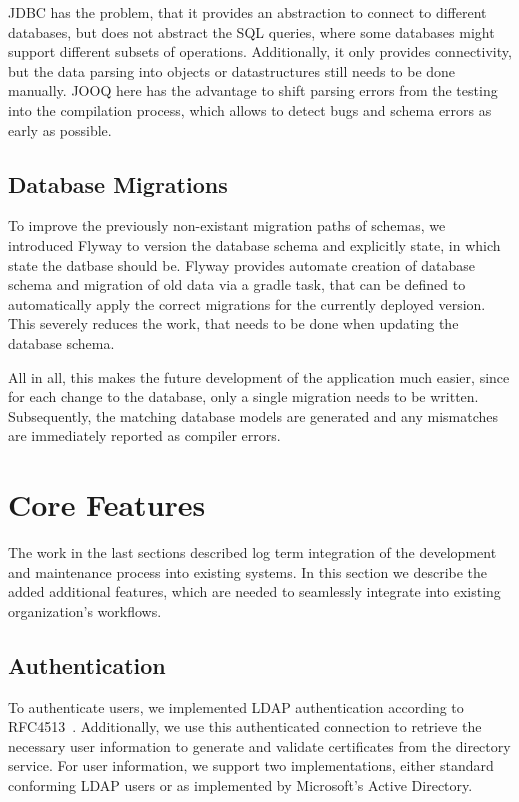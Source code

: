 JDBC has the problem, that it provides an abstraction to connect to different databases, but does not abstract the
SQL queries, where some databases might support different subsets of operations.
Additionally, it only provides connectivity, but the data parsing into objects or datastructures still needs to be done
manually.
JOOQ here has the advantage to shift parsing errors from the testing into the compilation process, which allows to
detect bugs and schema errors as early as possible.

\subsection*{Database Migrations}
To improve the previously non-existant migration paths of schemas, we introduced Flyway to version the database schema
and explicitly state, in which state the datbase should be.
Flyway provides automate creation of database schema and migration of old data via a gradle task, that can be defined to
automatically apply the correct migrations for the currently deployed version.
This severely reduces the work, that needs to be done when updating the database schema.

All in all, this makes the future development of the application much easier, since for each change to the database,
only a single migration needs to be written.
Subsequently, the matching database models are generated and any mismatches are immediately reported as compiler errors.

\section{Core Features}\label{sec:coreFeatures}

The work in the last sections described log term integration of the development and maintenance process into existing
systems.
In this section we describe the added additional features, which are needed to seamlessly integrate into existing
organization's workflows.

\subsection*{Authentication}
To authenticate users, we implemented LDAP authentication according to RFC4513~\cite{RFC4513}.
Additionally, we use this authenticated connection to retrieve the necessary user information to generate and validate
certificates from the directory service.
For user information, we support two implementations, either standard conforming LDAP users or as implemented by
Microsoft's Active Directory.

